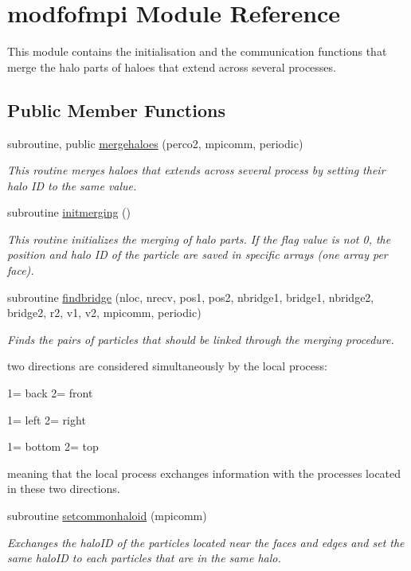\hypertarget{classmodfofmpi}{\section{modfofmpi Module Reference}
\label{classmodfofmpi}
}


This module contains the initialisation and the communication functions that merge the halo parts of haloes that extend across several processes.  


\subsection*{Public Member Functions}
\begin{DoxyCompactItemize}
\item 
subroutine, public \hyperlink{classmodfofmpi_a8fbc997f93fd71798027bc6946d3bddb}{mergehaloes} (perco2, mpicomm, periodic)
\begin{DoxyCompactList}\small\item\em This routine merges haloes that extends across several process by setting their halo I\-D to the same value. \end{DoxyCompactList}\item 
subroutine \hyperlink{classmodfofmpi_ac5a219c1a82d90230bcb2b1260adc4b4}{initmerging} ()
\begin{DoxyCompactList}\small\item\em This routine initializes the merging of halo parts. If the flag value is not 0, the position and halo I\-D of the particle are saved in specific arrays (one array per face). \end{DoxyCompactList}\item 
subroutine \hyperlink{classmodfofmpi_ad3a945459cf7b001e4c4e51429eb8f31}{findbridge} (nloc, nrecv, pos1, pos2, nbridge1, bridge1, nbridge2, bridge2, r2, v1, v2, mpicomm, periodic)
\begin{DoxyCompactList}\small\item\em Finds the pairs of particles that should be linked through the merging procedure. \par
 two directions are considered simultaneously by the local process\-: \par
 1= back 2= front \par
 1= left 2= right \par
 1= bottom 2= top \par
 meaning that the local process exchanges information with the processes located in these two directions. \end{DoxyCompactList}\item 
subroutine \hyperlink{classmodfofmpi_ae5663edf5a2902f952f8d6d3f5c4c8a5}{setcommonhaloid} (mpicomm)
\begin{DoxyCompactList}\small\item\em Exchanges the halo\-I\-D of the particles located near the faces and edges and set the same halo\-I\-D to each particles that are in the same halo. \end{DoxyCompactList}\end{DoxyCompactItemize}
